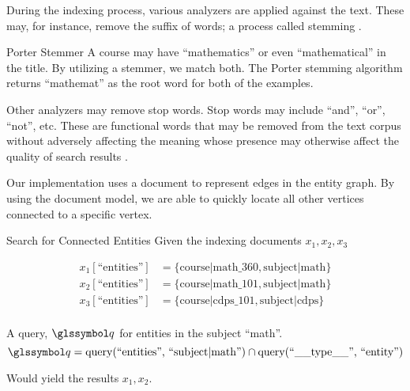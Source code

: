 			During the indexing process, various analyzers are applied against the text.  These may, for instance, remove the suffix of words; a process called stemming \cite{porter-97}.
			
			\begin{ex}{Porter Stemmer}
				A course may have ``mathematics'' or even ``mathematical'' in the title.  By utilizing a stemmer, we match both.  The Porter stemming algorithm returns ``mathemat'' as the root word for both of the examples.
			\end{ex}
			
			Other analyzers may remove stop words.  Stop words may include ``and'', ``or'', ``not'', etc.  These are functional words that may be removed from the text corpus without adversely affecting the meaning whose presence may otherwise affect the quality of search results \cite{silva-03}.
			
			Our implementation uses a document to represent edges in the entity graph.  By using the document model, we are able to quickly locate all other vertices connected to a specific vertex.
			
			\begin{ex}{Search for Connected Entities}
				Given the indexing documents \(x_1, x_2, x_3\)
				
				\begin{align*}
					x_1[\text{``entities''}] &= \{\text{course|math\_360}, \text{subject|math}\} \\
					x_2[\text{``entities''}] &= \{\text{course|math\_101}, \text{subject|math}\} \\
					x_3[\text{``entities''}] &= \{\text{course|cdps\_101}, \text{subject|cdps}\} \\
				\end{align*}
				
				A query, \(\q\) for entities in the subject ``math''.
				\[
					\q = \query(\text{``entities'', ``subject|math''}) \cap \query(\text{``\_\_type\_\_'', ``entity''})
				\]
				
				Would yield the results \(x_1, x_2\).
			\end{ex}
		
